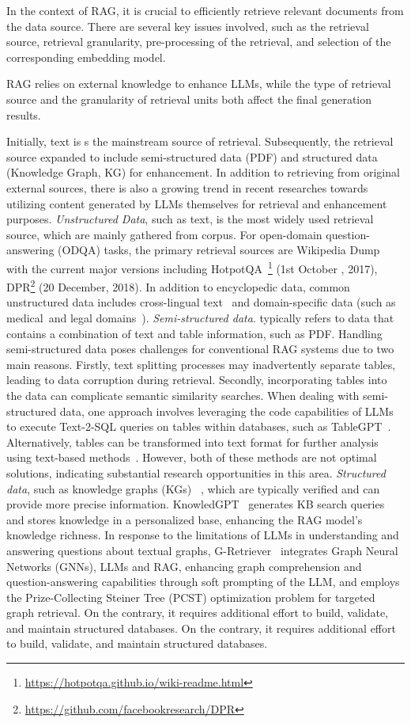 \label{sec:retrieval}
In the context of RAG, it is crucial to efficiently retrieve relevant documents from the data source. There are several key issues involved, such as the retrieval source, retrieval granularity, pre-processing of the retrieval, and selection of the corresponding embedding model.

RAG relies on external knowledge to enhance LLMs, while the type of retrieval source and the granularity of retrieval units both affect the final generation results.

Initially, text is s the mainstream source of retrieval. Subsequently, the retrieval source expanded to include semi-structured data (PDF) and  structured data (Knowledge Graph, KG) for enhancement. In addition to retrieving from original external sources, there is also a growing trend in recent researches towards utilizing content generated by LLMs themselves for retrieval and enhancement purposes.
\emph{Unstructured Data}, such as text, is the most  widely used retrieval source, which are mainly gathered from corpus. For open-domain question-answering (ODQA) tasks, the primary retrieval sources are Wikipedia  Dump  with the current major versions including  HotpotQA~\footnote{\url{https://hotpotqa.github.io/wiki-readme.html}} (1st October , 2017), DPR\footnote{\url{https://github.com/facebookresearch/DPR}} (20 December, 2018). In addition to encyclopedic data, common unstructured data includes cross-lingual text~ and domain-specific data (such as medical~and legal domains~). 
\emph{Semi-structured data}. typically refers to data that contains a combination of text and table information, such as PDF. Handling semi-structured data poses challenges for conventional RAG systems due to two main reasons. Firstly, text splitting processes may inadvertently separate tables, leading to data corruption during retrieval. Secondly, incorporating tables into the data can complicate semantic similarity searches. When dealing with semi-structured data, one approach involves leveraging the code capabilities of LLMs to execute Text-2-SQL queries on tables within databases, such as TableGPT~. Alternatively, tables can be transformed into text format for further analysis using text-based methods~. However, both of these methods are not optimal solutions, indicating substantial research opportunities in this area.
\emph{Structured data}, such as knowledge graphs (KGs)~ , which are typically verified and can  provide more precise information. KnowledGPT~ generates KB search queries and stores knowledge in a personalized base, enhancing the RAG model's knowledge richness. In response to the limitations of LLMs in understanding and answering questions about textual graphs, G-Retriever~  integrates Graph Neural Networks (GNNs), LLMs and RAG, enhancing graph comprehension and question-answering capabilities through soft prompting of the LLM, and employs the Prize-Collecting Steiner Tree (PCST) optimization problem for targeted graph retrieval. On the contrary, it requires additional effort to build, validate, and maintain structured databases. On the contrary, it requires additional effort to build, validate, and maintain structured databases.
